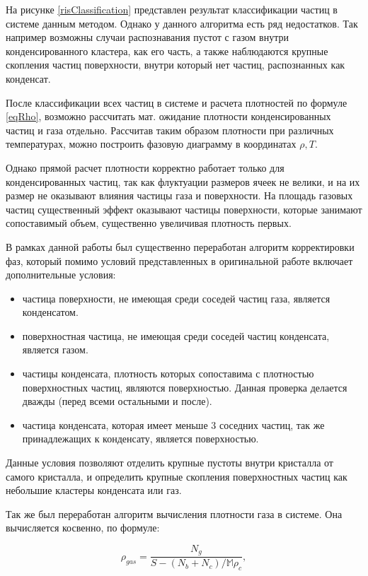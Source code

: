 На рисунке \ref{risClassification} представлен результат классификации частиц в системе данным методом. Однако у данного алгоритма есть ряд недостатков. Так например возможны случаи распознавания пустот с газом внутри конденсированного кластера, как его часть, а также наблюдаются крупные скопления частиц поверхности, внутри который нет частиц, распознанных как конденсат.


После классификации всех частиц в системе и расчета плотностей по формуле \ref{eqRho}, возможно рассчитать мат. ожидание плотности конденсированных частиц и газа отдельно.
Рассчитав таким образом плотности при различных температурах, можно построить фазовую диаграмму в координатах $\rho, T$.


Однако прямой расчет плотности корректно работает только для конденсированных частиц, так как флуктуации размеров ячеек не велики, и на их размер не оказывают влияния частицы газа и поверхности. На площадь газовых частиц существенный эффект оказывают частицы поверхности, которые занимают сопоставимый объем, существенно увеличивая плотность первых.


В рамках данной работы был существенно переработан алгоритм корректировки фаз, который помимо условий представленных в оригинальной работе включает дополнительные условия:
\begin{itemize}
\item частица поверхности, не имеющая среди соседей частиц газа, является конденсатом.
\item поверхностная частица, не имеющая среди соседей частиц конденсата, является газом.

\item частицы конденсата, плотность которых сопоставима с плотностью поверхностных частиц, являются поверхностью. Данная проверка делается дважды (перед всеми остальными и после).

\item частица конденсата, которая имеет меньше 3 соседних частиц, так же принадлежащих к конденсату, является поверхностью.
\end{itemize}


Данные условия позволяют отделить крупные пустоты внутри кристалла от самого кристалла, и определить крупные скопления поверхностных частиц как небольшие кластеры конденсата или газ.


Так же был переработан алгоритм вычисления плотности газа в системе. Она вычисляется косвенно, по формуле:

\begin{equation}
\rho_{gas} = \frac{N_{g}}{S - (N_{b} + N_{c}) / \mathbb{M}\rho_c},
\label{eqGas}
\end{equation}

